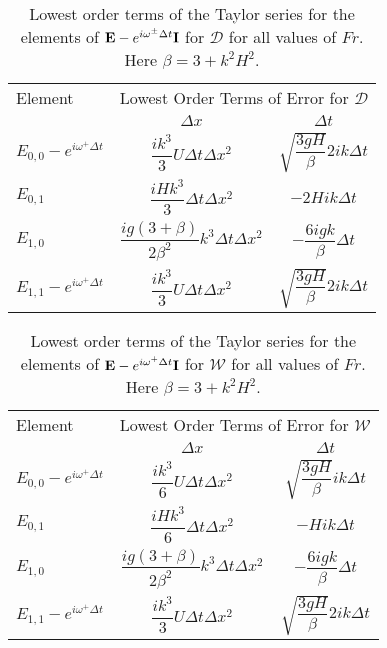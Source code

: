 \begin{table}
	\centering
	\begin{tabular}{l  c c}
		\hline
		Element & \multicolumn{2}{c}{Lowest Order Terms of Error for $\mathcal{D}$} \T \B \\
		\cline{2-3}
		& $\Delta x$&$\Delta t$ \T \B \\
		\hline
		$E_{0,0} -  e^{i \omega^+ \Delta t} $&  $\dfrac{ik^3}{3} U \Delta t \Delta x^2$ & $ \sqrt{\dfrac{3gH}{\beta}} 2ik \Delta t $ \T \B  \\
		$E_{0,1}$& $\dfrac{iHk^3}{3} \Delta t \Delta x^2$ &  $-2Hi k \Delta t$ \T \B  \\
		$E_{1,0}$& $ \dfrac{ig \left(3 + \beta\right)}{2\beta^2} k^3\Delta t \Delta x^2$ &  $ -\dfrac{6igk}{\beta} \Delta t$ \T \B  \\
		$E_{1,1} -  e^{i \omega^+ \Delta t}$& $\dfrac{ik^3}{3} U \Delta t \Delta x^2$ & $ \sqrt{\dfrac{3gH}{\beta}} 2ik \Delta t $ \T \B  \\  \hline
	\end{tabular}
	\caption{Lowest order terms of the Taylor series for the elements of $\mathbf{E} - e^{i \omega^\pm \Delta t} \mathbf{I}$ for $\mathcal{D}$ for all values of $Fr$. Here $\beta = 3 + k^2 H^2$.}
	\label{tab:EerrD} 
\end{table}
\begin{table}
	\centering
	\begin{tabular}{l  c c}
		\hline
		Element & \multicolumn{2}{c}{Lowest Order Terms of Error for $\mathcal{W}$} \T \B \\
		\cline{2-3} 
		& $\Delta x$&$\Delta t$ \T \B \\
		\hline 
		$E_{0,0} -  e^{i \omega^+ \Delta t} $&  $\dfrac{ik^3}{6} U \Delta t \Delta x^2$ & $ \sqrt{\dfrac{3gH}{\beta}} ik \Delta t $ \T \B \\
		$E_{0,1}$& $\dfrac{iHk^3}{6} \Delta t \Delta x^2$ &  $-Hi k \Delta t$ \T \B \\
		$E_{1,0}$& $ \dfrac{ig \left(3 + \beta\right)}{2\beta^2} k^3\Delta t \Delta x^2$ &  $ -\dfrac{6igk}{\beta} \Delta t$ \T \B  \\
		$E_{1,1} -  e^{i \omega^+ \Delta t}$& $\dfrac{ik^3}{3} U \Delta t \Delta x^2$ & $ \sqrt{\dfrac{3gH}{\beta}} 2ik \Delta t $ \T \B  \\  \hline
	\end{tabular}
	\caption{Lowest order terms of the Taylor series for the elements of $\mathbf{E} - e^{i \omega^+ \Delta t} \mathbf{I}$ for $\mathcal{W}$ for all values of $Fr$. Here $\beta = 3 + k^2 H^2$.}
	\label{tab:EerrW} 
\end{table}
